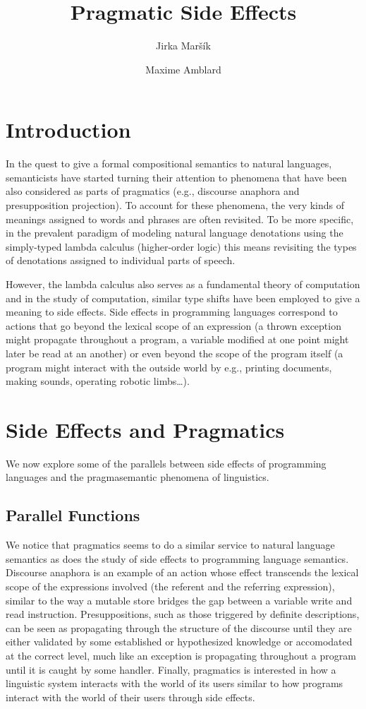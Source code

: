 \documentclass[a4paper,11pt,DIV=12]{scrartcl}
\title{Pragmatic Side Effects}
\author{Jirka Maršík \and Maxime Amblard}
\begin{document}
\maketitle

\section{Introduction}

In the quest to give a formal compositional semantics to natural languages,
semanticists have started turning their attention to phenomena that have
been also considered as parts of pragmatics (e.g., discourse anaphora and
presupposition projection). To account for these phenomena, the very kinds
of meanings assigned to words and phrases are often revisited. To be more
specific, in the prevalent paradigm of modeling natural language
denotations using the simply-typed lambda calculus (higher-order logic)
this means revisiting the types of denotations assigned to individual parts
of speech.

However, the lambda calculus also serves as a fundamental theory of
computation and in the study of computation, similar type shifts have been
employed to give a meaning to side effects. Side effects in programming
languages correspond to actions that go beyond the lexical scope of an
expression (a thrown exception might propagate throughout a program, a
variable modified at one point might later be read at an another) or even
beyond the scope of the program itself (a program might interact with the
outside world by e.g., printing documents, making sounds, operating robotic
limbs\ldots).

\section{Side Effects and Pragmatics}

We now explore some of the parallels between side effects of programming
languages and the pragmasemantic phenomena of linguistics.

\subsection{Parallel Functions}

We notice that pragmatics seems to do a similar service to natural language
semantics as does the study of side effects to programming language
semantics. Discourse anaphora is an example of an action whose effect
transcends the lexical scope of the expressions involved (the referent and
the referring expression), similar to the way a mutable store bridges the
gap between a variable write and read instruction. Presuppositions, such as
those triggered by definite descriptions, can be seen as propagating
through the structure of the discourse until they are either validated by
some established or hypothesized knowledge or accomodated at the correct
level, much like an exception is propagating throughout a program until it
is caught by some handler. Finally, pragmatics is interested in how a
linguistic system interacts with the world of its users similar to how
programs interact with the world of their users through side effects.
\end{document}
